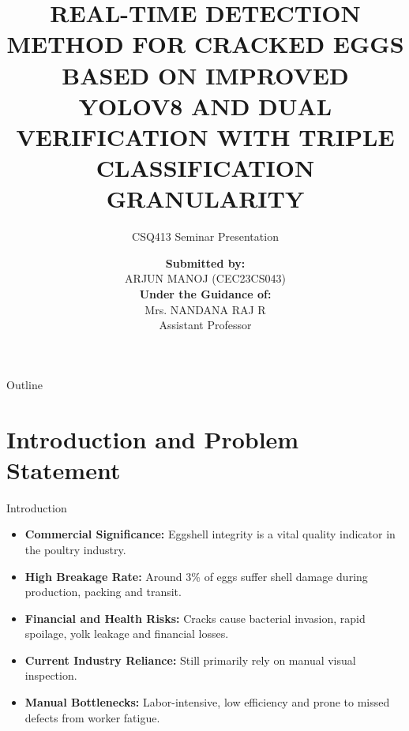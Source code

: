 \documentclass{beamer}
\title[Cracked Egg Detection]{\large \textbf{REAL-TIME DETECTION METHOD FOR CRACKED EGGS BASED ON IMPROVED YOLOV8 AND DUAL VERIFICATION WITH TRIPLE CLASSIFICATION GRANULARITY}}
\subtitle{CSQ413 Seminar Presentation}
\author[Arjun Manoj | CEC23CS043]{
\textbf{Submitted by:} \\ ARJUN MANOJ (CEC23CS043) \\[0.25cm]
\textbf{Under the Guidance of:} \\ Mrs. NANDANA RAJ R \\ Assistant Professor
}
\institute[]{
Department of Computer Science and Engineering \\ College of Engineering, Cherthala
}
\date{}
\begin{document}
\begin{frame}
  \titlepage
\end{frame}

\begin{frame}{Outline}
\tableofcontents
\end{frame}

\section{Introduction and Problem Statement}

\begin{frame}{Introduction}
\small
\begin{itemize}
    \item \textbf{Commercial Significance:} Eggshell integrity is a vital quality indicator in the poultry industry.
    \medskip
    \item \textbf{High Breakage Rate:} Around 3\% of eggs suffer shell damage during production, packing and transit.
    \medskip
    \item \textbf{Financial and Health Risks:} Cracks cause bacterial invasion, rapid spoilage, yolk leakage and financial losses.
    \medskip
    \item \textbf{Current Industry Reliance:} Still primarily rely on manual visual inspection.
    \medskip
    \item \textbf{Manual Bottlenecks:} Labor-intensive, low efficiency and prone to missed defects from worker fatigue.
\end{itemize}
\end{frame}
\end{document}

